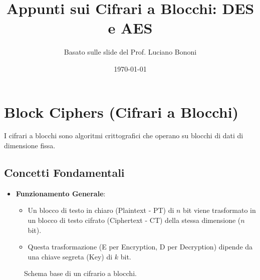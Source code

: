 \documentclass{article}
\title{Appunti sui Cifrari a Blocchi: DES e AES}
\author{Basato sulle slide del Prof. Luciano Bononi}
\date{\today}
\begin{document}
\maketitle
\tableofcontents
\newpage

\section{Block Ciphers (Cifrari a Blocchi)}

I cifrari a blocchi sono algoritmi crittografici che operano su blocchi di dati di dimensione fissa.

\subsection{Concetti Fondamentali}
\begin{itemize}
    \item \textbf{Funzionamento Generale}:
    \begin{itemize}
        \item Un blocco di testo in chiaro (Plaintext - PT) di $n$ bit viene trasformato in un blocco di testo cifrato (Ciphertext - CT) della stessa dimensione ($n$ bit).
        \item Questa trasformazione (E per Encryption, D per Decryption) dipende da una chiave segreta (Key) di $k$ bit.
    \end{itemize}
\end{itemize}

\begin{figure}[H]
\centering
{}
\caption{Schema base di un cifrario a blocchi.}
\end{figure}
\end{document}
